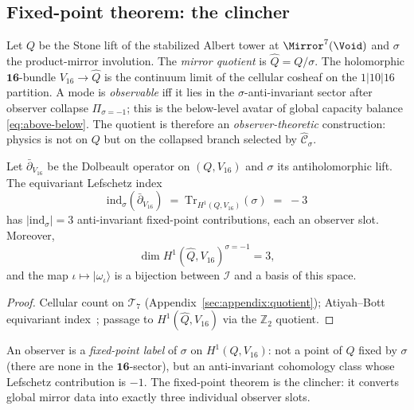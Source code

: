 \subsection{Fixed-point theorem: the clincher}
\label{sec:observer:fixed-point}

\begin{definition}\label{def:Qhat}
Let $Q$ be the Stone lift of the stabilized Albert tower at
$\Mirror^7(\Void)$ and $\sigma$ the product-mirror involution. The
\emph{mirror quotient} is $\hat Q=Q/\sigma$. The holomorphic
$\mathbf{16}$-bundle $V_{16}\to\hat Q$ is the continuum limit of the
cellular cosheaf on the $1|10|16$ partition. A mode is \emph{observable}
iff it lies in the $\sigma$-anti-invariant sector after observer collapse
$\Pi_{\sigma=-1}$; this is the below-level avatar of global capacity balance
\eqref{eq:above-below}. The quotient is therefore an \emph{observer-theoretic}
construction: physics is not on $Q$ but on the collapsed branch selected by
$\hat{\mathcal{C}}_\sigma$.
\end{definition}

\begin{theorem}\label{thm:observer-fp}
Let $\bar\partial_{V_{16}}$ be the Dolbeault operator on $(Q,V_{16})$ and
$\sigma$ its antiholomorphic lift. The equivariant Lefschetz index
\begin{equation}\label{eq:lefschetz}
  \mathrm{ind}_\sigma(\bar\partial_{V_{16}})
  \;=\;
  \mathrm{Tr}_{H^1(Q,V_{16})}(\sigma)
  \;=\; -3
\end{equation}
has $|\mathrm{ind}_\sigma|=3$ anti-invariant fixed-point contributions, each
an observer slot. Moreover,
\begin{equation}\label{eq:h1-observer}
  \dim H^1(\hat Q,V_{16})^{\sigma=-1}=3,
\end{equation}
and the map $\iota\mapsto|\omega_\iota\rangle$ is a bijection between
$\mathcal{I}$ and a basis of this space.
\end{theorem}

\begin{proof}
Cellular count on $\mathcal{T}_7$ (Appendix~\ref{sec:appendix:quotient});
Atiyah--Bott equivariant index~\cite{AtiyahBott1966}; passage to
$H^1(\hat Q,V_{16})$ via the $\mathbb{Z}_2$ quotient.
\end{proof}

\begin{corollary}\label{cor:observer-fp}
An observer is a \emph{fixed-point label} of $\sigma$ on $H^1(Q,V_{16})$:
not a point of $Q$ fixed by $\sigma$ (there are none in the
$\mathbf{16}$-sector), but an anti-invariant cohomology class whose
Lefschetz contribution is $-1$. The fixed-point theorem is the clincher:
it converts global mirror data into exactly three individual observer slots.
\end{corollary}

